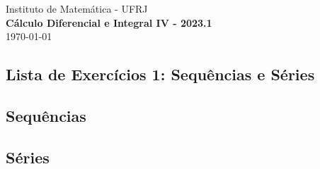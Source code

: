 \documentclass[12pt]{book}
\begin{document}
\begin{center}
    {\Large Instituto de Matemática - UFRJ}\\
    \textbf{Cálculo Diferencial e Integral IV - 2023.1}\\ %
    \today%
\end{center}

\vspace{0.2 cm}

\subsection*{Lista de Exercícios 1: Sequências e Séries}

\subsection*{Sequências}

\begin{enumerate}
    
    
    
    
    
\end{enumerate}

\subsection*{Séries}

\begin{enumerate}\setcounter{enumi}{5}
    
    
    
    
    
    
    
\end{enumerate}
\end{document}
